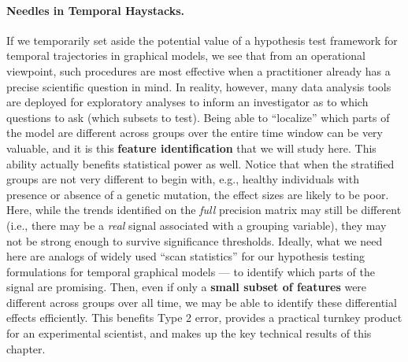 \paragraph{Needles in Temporal Haystacks.} If we temporarily set aside the potential value of a hypothesis test framework for temporal 
trajectories in graphical models, we see that
from an operational viewpoint, such procedures are most effective when a practitioner already has a precise scientific question in mind. In reality, however, 
many data analysis tools are deployed for exploratory analyses to inform an investigator as to which questions to ask (which subsets to test). 
Being able to ``localize'' which parts of the model are different across groups over the entire time window can be very valuable,
and it is this \textbf{feature identification} that we will study here.
This ability actually 
benefits statistical power as well. Notice that when the stratified groups are not very different 
to begin with, e.g., healthy individuals with presence or absence of a genetic mutation, the
effect sizes are likely to be poor.
Here, while the trends identified on the {\em full} precision matrix may still be different (i.e., there may be a {\em real} signal 
associated with a grouping variable), 
they may not be strong enough to survive significance thresholds. Ideally, what we need here are analogs of widely used ``scan statistics'' 
for our hypothesis testing formulations for temporal graphical models --- to identify which parts of the signal are promising. 
Then, even if only a \textbf{small subset of 
features} were different across groups over all time,
we may be able to identify these differential effects efficiently. This benefits Type 2 error, 
provides a practical turnkey product for an experimental scientist, and makes up the key technical results of this chapter.

